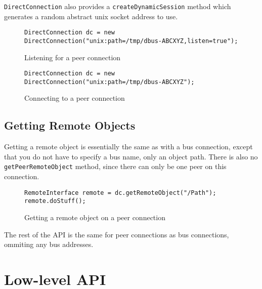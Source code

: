\documentclass[a4paper,12pt]{article}
\begin{document}
{\tt DirectConnection} also provides a {\tt createDynamicSession} method which
generates a random abstract unix socket address to use.

\begin{figure}[htb]
\begin{center}
\begin{verbatim}
DirectConnection dc = new DirectConnection("unix:path=/tmp/dbus-ABCXYZ,listen=true");
\end{verbatim}
\end{center}
\caption{Listening for a peer connection}
\label{fig:p2plisten}
\end{figure}

\begin{figure}[htb]
\begin{center}
\begin{verbatim}
DirectConnection dc = new DirectConnection("unix:path=/tmp/dbus-ABCXYZ");
\end{verbatim}
\end{center}
\caption{Connecting to a peer connection}
\label{fig:p2pconnect}
\end{figure}

\subsection{Getting Remote Objects}

Getting a remote object is essentially the same as with a bus connection,
except that you do not have to specify a bus name, only an object path. There
is also no {\tt getPeerRemoteObject} method, since there can only be one peer
on this connection.

\begin{figure}[htb]
\begin{center}
\begin{verbatim}
RemoteInterface remote = dc.getRemoteObject("/Path");
remote.doStuff();
\end{verbatim}
\end{center}
\caption{Getting a remote object on a peer connection}
\label{fig:p2premote}
\end{figure}

The rest of the API is the same for peer connections as bus connections,
ommiting any bus addresses.

\section{Low-level API}
\end{document}
